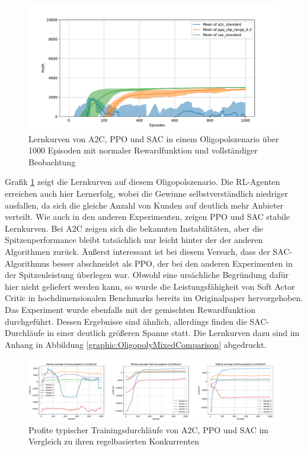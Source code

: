 \begin{figure}[htbp]
	\centering
	\includegraphics[width=\textwidth]{main/comparison_oligopoly.pdf}
	\caption{Lernkurven von A2C, PPO und SAC in einem Oligopolszenario über 1000 Episoden mit normaler Rewardfunktion und vollständiger Beobachtung}
	\label{graphic:OligopolyComparison}
\end{figure}

Grafik \ref{graphic:OligopolyComparison} zeigt die Lernkurven auf diesem Oligopolszenario.
Die RL-Agenten erreichen auch hier Lernerfolg, wobei die Gewinne selbstverständlich niedriger ausfallen, da sich die gleiche Anzahl von Kunden auf deutlich mehr Anbieter verteilt.
Wie auch in den anderen Experimenten, zeigen PPO und SAC stabile Lernkurven.
Bei A2C zeigen sich die bekannten Instabilitäten, aber die Spitzenperformance bleibt tatsächlich nur leicht hinter der der anderen Algorithmen zurück.
Äußerst interessant ist bei diesem Versuch, dass der SAC-Algorithmus besser abschneidet als PPO, der bei den anderen Experimenten in der Spitzenleistung überlegen war.
Obwohl eine ursächliche Begründung dafür hier nicht geliefert werden kann, so wurde die Leistungsfähigkeit von Soft Actor Critic in hochdimensionalen Benchmarks bereits im Originalpaper hervorgehoben. \cite{haarnoja2018soft}
Das Experiment wurde ebenfalls mit der gemischten Rewardfunktion durchgeführt.
Dessen Ergebnisse sind ähnlich, allerdings finden die SAC-Durchläufe in einer deutlich größeren Spanne statt.
Die Lernkurven dazu sind im Anhang in Abbildung \ref{graphic:OligopolyMixedComparison} abgedruckt.

\begin{figure}[htbp]
	\centering
	\includegraphics[width=\textwidth]{main/oligopoly_vendor_comparison.pdf}
	\caption{Profite typischer Trainingsdurchläufe von A2C, PPO und SAC im Vergleich zu ihren regelbasierten Konkurrenten}
	\label{graphic:OligopolyVendorComparison}
\end{figure}

